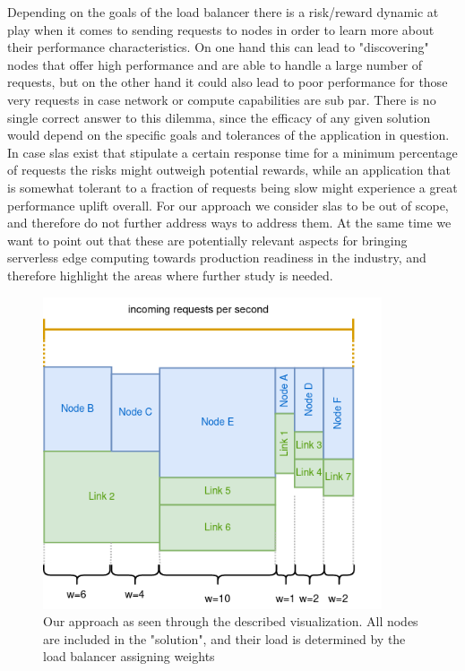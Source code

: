 \documentclass[draft,final]{vutinfth} %
\begin{document}
Depending on the goals of the load balancer there is a risk/reward dynamic at play when it comes to sending requests to nodes in order to learn more about their performance characteristics. On one hand this can lead to "discovering" nodes that offer high performance and are able to handle a large number of requests, but on the other hand it could also lead to poor performance for those very requests in case network or compute capabilities are sub par.
There is no single correct answer to this dilemma, since the efficacy of any given solution would depend on the specific goals and tolerances of the application in question. In case \glspl{sla} exist that stipulate a certain response time for a minimum percentage of requests the risks might outweigh potential rewards, while an application that is somewhat tolerant to a fraction of requests being slow might experience a great performance uplift overall.
For our approach we consider \glspl{sla} to be out of scope, and therefore do not further address ways to address them. At the same time we want to point out that these are potentially relevant aspects for bringing serverless edge computing towards production readiness in the industry, and therefore highlight the areas where further study is needed.

\begin{figure}
    \centering
    \includegraphics[width=10cm]{graphics/diagrams/lb_weights.png}
    \caption{Our approach as seen through the described visualization. All nodes are included in the "solution", and their load is determined by the load balancer assigning weights}
    \label{fig:lb_weights}
\end{figure}
\end{document}
